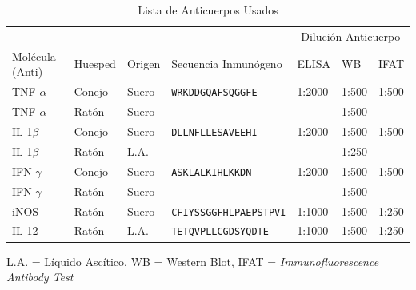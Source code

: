 \documentclass[12pt,a4paper,oneside]{scrbook}
\begin{document}
\begin{table}[h!]
\sffamily
  \begin{center}
    \begin{threeparttable}
      \caption{Lista de Anticuerpos Usados}\label{tabla:anticuerpos}
      \begin{tabularx}{16cm}{l l l X l l l}
    \toprule
    \multicolumn{4}{c}{} & \multicolumn{3}{c}{Dilución Anticuerpo} \\
    \cmidrule(r){5-7}
    Molécula (Anti) & Huesped & Origen & Secuencia Inmunógeno & ELISA & WB & IFAT \\
    \midrule
    TNF-$\alpha$ & Conejo & Suero & \texttt{WRKDDGQAFSQGGFE} & 1:2000 & 1:500 & 1:500 \\
    TNF-$\alpha$ & Ratón & Suero & \texttt{ } & - & 1:500 & - \\
    IL-1$\beta$ & Conejo & Suero &  \texttt{DLLNFLLESAVEEHI} & 1:2000 & 1:500 & 1:500 \\
    IL-1$\beta$ & Ratón & L.A. & \texttt{} & - & 1:250 & - \\
    IFN-$\gamma$ & Conejo & Suero & \texttt{ASKLALKIHLKKDN} & 1:2000 & 1:500 & 1:500 \\
    IFN-$\gamma$ & Ratón & Suero & \texttt{ } & - & 1:500 & - \\
    iNOS & Ratón & Suero & \texttt{CFIYSSGGFHLPAEPSTPVI} & 1:1000 & 1:500 & 1:250 \\
    IL-12 & Ratón & L.A. & \texttt{TETQVPLLCGDSYQDTE} & 1:1000 & 1:500 & 1:250 \\
    \bottomrule
        \end{tabularx}
\begin{tablenotes}
  \item *L.A. = Líquido Ascítico, WB = Western Blot, IFAT = \emph{Immunofluorescence Antibody Test}
\end{tablenotes}
\end{threeparttable}
\end{center}
\end{table}
\end{document}
